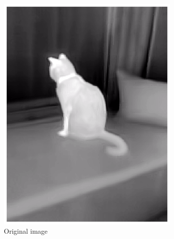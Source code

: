\documentclass{l4proj}
\begin{document}
\begin{figure}[ht]
  \centering
  \begin{subfigure}[h!]{0.24\textwidth}
    \includegraphics[width=\textwidth]{images/augmentation/original.png}
    \caption{Original image}
  \end{subfigure}
  \begin{subfigure}[h!]{0.24\textwidth}

\end{subfigure}
\end{figure}
\end{document}
